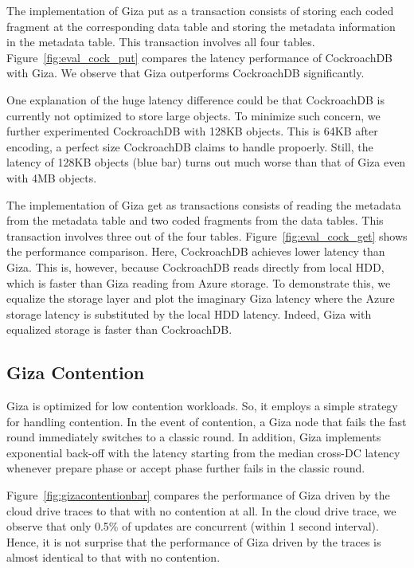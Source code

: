 The implementation of Giza put as a transaction consists of storing each coded fragment at the corresponding data table and storing the metadata information in the metadata table. This transaction involves all four tables. Figure~\ref{fig:eval_cock_put} compares the latency performance of CockroachDB with Giza. We observe that Giza outperforms CockroachDB significantly.

One explanation of the huge latency difference could be that CockroachDB is currently not optimized to store large objects. To minimize such concern, we further experimented CockroachDB with 128KB objects. This is 64KB after encoding, a perfect size CockroachDB claims to handle propoerly. Still, the latency of 128KB objects (blue bar) turns out much worse than that of Giza even with 4MB objects.

The implementation of Giza get as transactions consists of reading the metadata from the metadata table and two coded fragments from the data tables. This transaction involves three out of the four tables. Figure~\ref{fig:eval_cock_get} shows the performance comparison. Here, CockroachDB achieves lower latency than Giza. This is, however, because CockroachDB reads directly from local HDD, which is faster than Giza reading from Azure storage. To demonstrate this, we equalize the storage layer and plot the imaginary Giza latency where the Azure storage latency is substituted by the local HDD latency. Indeed, Giza with equalized storage is faster than CockroachDB.



\subsection{Giza Contention}

Giza is optimized for low contention workloads. So, it employs a simple strategy for handling contention. In the event of contention, a Giza node that fails the fast round immediately switches to a classic round. In addition, Giza implements exponential back-off with the latency starting from the median cross-DC latency whenever prepare phase or accept phase further fails in the classic round.

Figure~\ref{fig:gizacontentionbar} compares the performance of Giza driven by the cloud drive traces to that with no contention at all. In the cloud drive trace, we observe that only 0.5\% of updates are concurrent (within 1 second interval). Hence, it is not surprise that the performance of Giza driven by the traces is almost identical to that with no contention.

